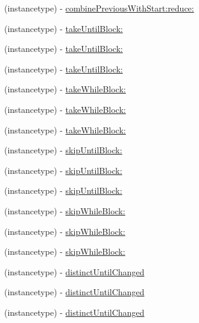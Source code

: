 \begin{DoxyCompactItemize}
\item 
(instancetype) -\/ \mbox{\hyperlink{interface_r_a_c_stream_a698f6ef68be8d3cb34f9be6efaaa5af7}{combine\+Previous\+With\+Start\+:reduce\+:}}
\item 
(instancetype) -\/ \mbox{\hyperlink{interface_r_a_c_stream_ac19d57150840e93112646eef310c2489}{take\+Until\+Block\+:}}
\item 
(instancetype) -\/ \mbox{\hyperlink{interface_r_a_c_stream_ac19d57150840e93112646eef310c2489}{take\+Until\+Block\+:}}
\item 
(instancetype) -\/ \mbox{\hyperlink{interface_r_a_c_stream_ac19d57150840e93112646eef310c2489}{take\+Until\+Block\+:}}
\item 
(instancetype) -\/ \mbox{\hyperlink{interface_r_a_c_stream_ae3b27f126fffcf5dfb8eaa6bd71c5fc4}{take\+While\+Block\+:}}
\item 
(instancetype) -\/ \mbox{\hyperlink{interface_r_a_c_stream_ae3b27f126fffcf5dfb8eaa6bd71c5fc4}{take\+While\+Block\+:}}
\item 
(instancetype) -\/ \mbox{\hyperlink{interface_r_a_c_stream_ae3b27f126fffcf5dfb8eaa6bd71c5fc4}{take\+While\+Block\+:}}
\item 
(instancetype) -\/ \mbox{\hyperlink{interface_r_a_c_stream_a008935d03ebc55b40b461dc080cddd38}{skip\+Until\+Block\+:}}
\item 
(instancetype) -\/ \mbox{\hyperlink{interface_r_a_c_stream_a008935d03ebc55b40b461dc080cddd38}{skip\+Until\+Block\+:}}
\item 
(instancetype) -\/ \mbox{\hyperlink{interface_r_a_c_stream_a008935d03ebc55b40b461dc080cddd38}{skip\+Until\+Block\+:}}
\item 
(instancetype) -\/ \mbox{\hyperlink{interface_r_a_c_stream_a1e323c308071aed5e01627d4d96ca9c8}{skip\+While\+Block\+:}}
\item 
(instancetype) -\/ \mbox{\hyperlink{interface_r_a_c_stream_a1e323c308071aed5e01627d4d96ca9c8}{skip\+While\+Block\+:}}
\item 
(instancetype) -\/ \mbox{\hyperlink{interface_r_a_c_stream_a1e323c308071aed5e01627d4d96ca9c8}{skip\+While\+Block\+:}}
\item 
(instancetype) -\/ \mbox{\hyperlink{interface_r_a_c_stream_a3af010b929b0c232ddbaa52f574fb888}{distinct\+Until\+Changed}}
\item 
(instancetype) -\/ \mbox{\hyperlink{interface_r_a_c_stream_a3af010b929b0c232ddbaa52f574fb888}{distinct\+Until\+Changed}}
\item 
(instancetype) -\/ \mbox{\hyperlink{interface_r_a_c_stream_a3af010b929b0c232ddbaa52f574fb888}{distinct\+Until\+Changed}}
\end{DoxyCompactItemize}
